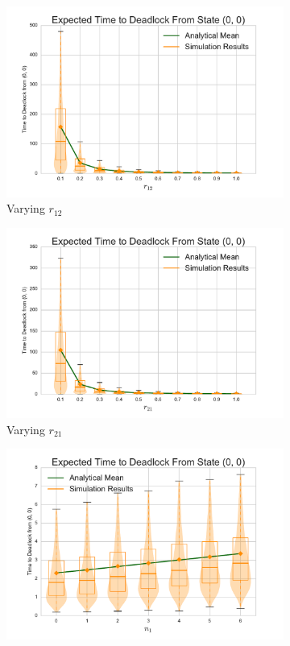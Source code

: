 \documentclass{article}
\numberwithin{equation}{section}
\begin{document}
\begin{figure}[!htbp]
\begin{subfigure}[b]{0.333\textwidth}
    \includegraphics[width=\textwidth]{images/varyr12_2Nms}
    \caption{Varying $r_{12}$}
    \label{fig:2Nms_r12}
  \end{subfigure}
  \begin{subfigure}[b]{0.333\textwidth}
    \includegraphics[width=\textwidth]{images/varyr21_2Nms}
    \caption{Varying $r_{21}$}
    \label{fig:2Nms_r21}
  \end{subfigure}
  \begin{center}
  \begin{subfigure}[b]{0.34\textwidth}
    \includegraphics[width=\textwidth]{images/varyn1_2Nms}

\end{subfigure}
\end{center}
\end{figure}
\end{document}
